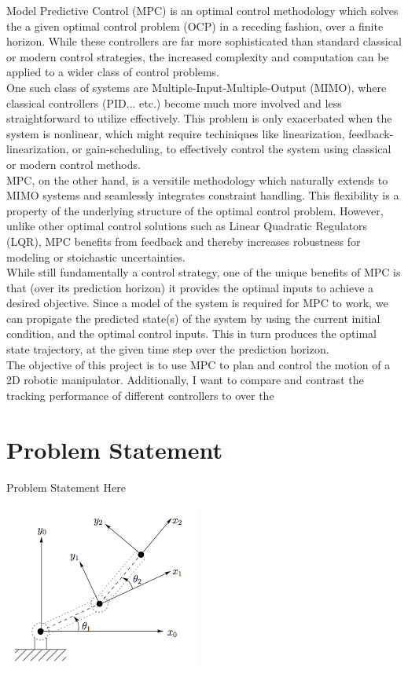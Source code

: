 \documentclass[journal]{IEEEtran}
\begin{document}
Model Predictive Control (MPC) is an optimal control methodology which solves the a given optimal control problem (OCP) in a receding fashion, over a finite horizon. While these controllers are far more sophisticated than standard classical or modern control strategies, the increased complexity and computation can be applied to a wider class of control problems. \\

One such class of systems are Multiple-Input-Multiple-Output (MIMO), where classical controllers (PID... etc.) become much more involved and less straightforward to utilize effectively. This problem is only exacerbated when the system is nonlinear, which might require techiniques like linearization, feedback-linearization, or gain-scheduling, to effectively control the system using classical or modern control methods. \\

MPC, on the other hand, is a versitile methodology which naturally extends to MIMO systems and seamlessly integrates constraint handling. This flexibility is a property of the underlying structure of the optimal control problem. However, unlike other optimal control solutions such as Linear Quadratic Regulators (LQR), MPC benefits from feedback and thereby increases robustness for modeling or stoichastic uncertainties.  \\

While still fundamentally a control strategy, one of the unique benefits of MPC is that (over its prediction horizon) it provides the optimal inputs to achieve a desired objective. Since a model of the system is required for MPC to work, we can propigate the predicted state(s) of the system by using the current initial condition, and the optimal control inputs. This in turn produces the optimal state trajectory, at the given time step over the prediction horizon. \\

The objective of this project is to use MPC to plan and control the motion of a 2D robotic manipulator. Additionally, I want to compare and contrast the tracking performance of different controllers to over the


\section{Problem Statement}

Problem Statement Here

\includegraphics[scale=.5]{./images/2d_arm_2}
\end{document}
